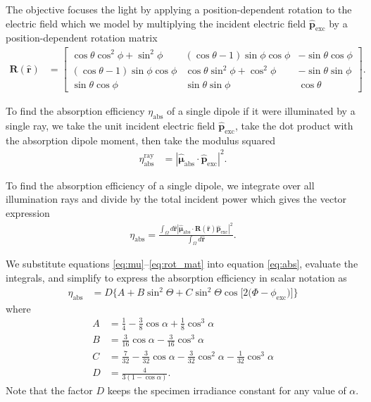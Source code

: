 \documentclass[10pt]{article}
\providecommand{\mb}[1]{\mathbf{#1}}
\providecommand{\mh}[1]{\mathbf{\hat{#1}}}
\providecommand{\bs}[1]{\boldsymbol{#1}}
\begin{document}
  The objective focuses the light by applying a position-dependent rotation to
  the electric field which we model by multiplying the incident electric field
  $\hat{\mb{p}}_{\text{exc}}$ by a position-dependent rotation matrix
  \begin{align}
  \mb{R}(\mh{r}) &= \begin{bmatrix} \cos\theta\cos^2\phi + \sin^2\phi & (\cos\theta -1)\sin\phi\cos\phi & -\sin\theta\cos\phi\\ (\cos\theta - 1)\sin\phi\cos\phi & \cos\theta\sin^2\phi + \cos^2\phi & -\sin\theta\sin\phi \\ \sin\theta\cos\phi& \sin\theta\sin\phi & \cos\theta \end{bmatrix} \label{eq:rot_mat}.
  \end{align}

  To find the absorption efficiency $\eta_{\text{abs}}$ of a single dipole if
  it were illuminated by a single ray, we take the unit incident electric field
  $\hat{\mb{p}}_{\text{exc}}$, take the dot product with the absorption dipole
  moment, then take the modulus squared
    \begin{align}
      \eta_{\text{abs}}^{\text{ray}} &= |\hat{\bs{\mu}}_{\text{abs}}\cdot\mh{p}_{\text{exc}}|^2. \label{eq:singleray}
    \end{align}

    To find the absorption efficiency of a single dipole, we integrate over
    all illumination rays and divide by the total incident power which gives the
    vector expression
\begin{align}
  \eta_{\text{abs}} = \frac{\int_{\Omega}d\mh{r}|\hat{\bs{\mu}}_{\text{abs}}\cdot\mb{R}(\mh{r})\mh{p}_{\text{exc}}|^2}{\int_{\Omega}d\mh{r}}\label{eq:abs}. 
\end{align}

We substitute equations \ref{eq:mu}--\ref{eq:rot_mat} into equation
\ref{eq:abs}, evaluate the integrals, and simplify to express the absorption
efficiency in scalar notation as
\begin{align}
  \eta_{\text{abs}} &= D\{A + B\sin^{2}{\Theta} + C\sin^{2}{\Theta} \cos{[2 (\Phi - \phi_{\text{exc}}})]\}\label{eq:scalarabs}
\end{align}
where
\begin{subequations}
\begin{align}
  A &= \frac{1}{4} - \frac{3}{8} \cos{\alpha } + \frac{1}{8} \cos^{3}{\alpha }\\
  B &= \frac{3}{16} \cos{\alpha } - \frac{3}{16} \cos^{3}{\alpha }\\
  C &= \frac{7}{32} - \frac{3}{32} \cos{\alpha } - \frac{3}{32} \cos^{2}{\alpha } - \frac{1}{32} \cos^{3}{\alpha}\\
  D &= \frac{4}{3(1 - \cos\alpha)}.
\end{align}\label{eq:coefficients}%
\end{subequations}
Note that the factor $D$ keeps the specimen irradiance constant for any value of
$\alpha$.
\end{document}

